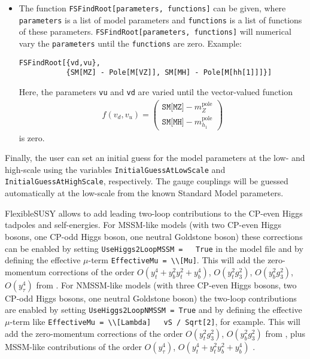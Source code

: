 \documentclass[final,3p,11pt,pdflatex]{elsarticle}
\makeatletter
\newcommand{\fs}{FlexibleSUSY\@\xspace}
\newcommand{\code}[1]{\lstinline|#1|}  %
\newcommand{\pole}{\text{pole}}
\makeatother
\begin{document}
\begin{itemize}
\item The function \code{FSFindRoot[parameters, functions]} can be
  given, where \code{parameters} is a list of model parameters and
  \code{functions} is a list of functions of these parameters.
  \code{FSFindRoot[parameters, functions]} will numerical vary the
  \code{parameters} until the \code{functions} are zero.  Example:
  \begin{lstlisting}
FSFindRoot[{vd,vu},
           {SM[MZ] - Pole[M[VZ]], SM[MH] - Pole[M[hh[1]]]}]
  \end{lstlisting}
  Here, the parameters \code{vu} and \code{vd} are varied until the
  vector-valued function
  \begin{align}
    f(v_d,v_u) =
    \begin{pmatrix}
      \texttt{SM[MZ]} - m_Z^\pole \\
      \texttt{SM[MH]} - m_{h_1}^\pole
    \end{pmatrix}
  \end{align}
  is zero.
\end{itemize}
%
Finally, the user can set an initial guess for the model parameters at
the low- and high-scale using the variables
\code{InitialGuessAtLowScale} and \code{InitialGuessAtHighScale},
respectively.  The gauge couplings will be guessed automatically at
the low-scale from the known Standard Model parameters.

\fs allows to add leading two-loop contributions to the CP-even Higgs
tadpoles and self-energies.  For MSSM-like models (with two CP-even
Higgs bosons, one CP-odd Higgs boson, one neutral Goldstone boson)
these corrections can be enabled by setting \code{UseHiggs2LoopMSSM =
  True} in the model file and by defining the effective $\mu$-term
\code{EffectiveMu = \\[Mu]}.  This will add the zero-momentum
corrections of the order $O(y_t^4 + y_b^2 y_t^2 + y_b^4)$, $O(y_t^2
g_3^2)$, $O(y_b^2 g_3^2)$, $O(y_\tau^4)$ from
\cite{Degrassi:2001yf,Brignole:2001jy,Dedes:2002dy,Brignole:2002bz,Dedes:2003km}.
For NMSSM-like models (with three CP-even Higgs bosons, two CP-odd
Higgs bosons, one neutral Goldstone boson) the two-loop contributions
are enabled by setting \code{UseHiggs2LoopNMSSM = True} and by
defining the effective $\mu$-term like \code{EffectiveMu = \\[Lambda]
  vS / Sqrt[2]}, for example.  This will add the zero-momentum
corrections of the order $O(y_t^2 g_3^2)$, $O(y_b^2 g_3^2)$ from
\cite{Degrassi:2009yq}, plus MSSM-like contributions of the order
$O(y_\tau^4)$, $O(y_t^4 + y_t^2 y_b^2 + y_b^4)$
\cite{Brignole:2001jy,Dedes:2003km}.
\end{document}

